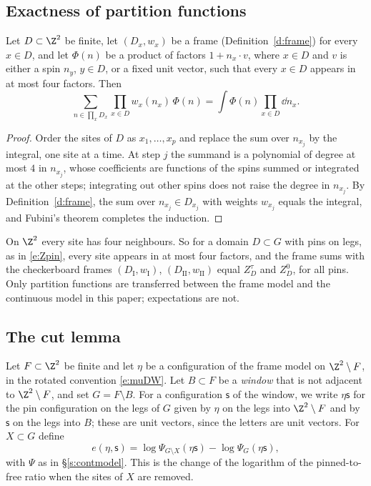 \subsection{Exactness of partition functions}\label{s:exact}

\begin{lemma}\label{l:exact}
Let $D \subset \Z^2$ be finite, let $(D_x, w_x)$ be a frame (Definition~\ref{d:frame}) for every $x \in D$, and let $\Phi(n)$ be a product of factors $1 + n_x \cdot v$, where $x \in D$ and $v$ is either a spin $n_y$, $y \in D$, or a fixed unit vector, such that every $x \in D$ appears in at most four factors. Then
\begin{equation*}
\sum_{n \in \prod_x D_x} \prod_{x \in D} w_x(n_x) \, \Phi(n) = \int \Phi(n) \prod_{x \in D} \dd n_x .
\end{equation*}
\end{lemma}

\begin{proof}
Order the sites of $D$ as $x_1, \dots, x_p$ and replace the sum over $n_{x_j}$ by the integral, one site at a time. At step $j$ the summand is a polynomial of degree at most $4$ in $n_{x_j}$, whose coefficients are functions of the spins summed or integrated at the other steps; integrating out other spins does not raise the degree in $n_{x_j}$. By Definition~\ref{d:frame}, the sum over $n_{x_j} \in D_{x_j}$ with weights $w_{x_j}$ equals the integral, and Fubini's theorem completes the induction.
\end{proof}

On $\Z^2$ every site has four neighbours. So for a domain $D \subset G$ with pins on legs, as in \eqref{e:Zpin}, every site appears in at most four factors, and the frame sums with the checkerboard frames $(D_{\mathrm I}, w_{\mathrm I})$, $(D_{\mathrm{II}}, w_{\mathrm{II}})$ equal $Z^\tau_D$ and $Z^0_D$, for all pins. Only partition functions are transferred between the frame model and the continuous model in this paper; expectations are not.

\subsection{The cut lemma}\label{s:cutlemma}

Let $F \subset \Z^2$ be finite and let $\eta$ be a configuration of the frame model on $\Z^2 \setminus F$, in the rotated convention \eqref{e:muDW}. Let $B \subset F$ be a \emph{window} that is not adjacent to $\Z^2 \setminus F$, and set $G = F \setminus B$. For a configuration $\mathsf s$ of the window, we write $\eta \mathsf s$ for the pin configuration on the legs of $G$ given by $\eta$ on the legs into $\Z^2 \setminus F$ and by $\mathsf s$ on the legs into $B$; these are unit vectors, since the letters are unit vectors. For $X \subset G$ define
\begin{equation}\label{e:cutcost}
e(\eta, \mathsf s) = \log \Psi_{G \setminus X}(\eta \mathsf s) - \log \Psi_G(\eta \mathsf s),
\end{equation}
with $\Psi$ as in \S\ref{s:contmodel}. This is the change of the logarithm of the pinned-to-free ratio when the sites of $X$ are removed.

